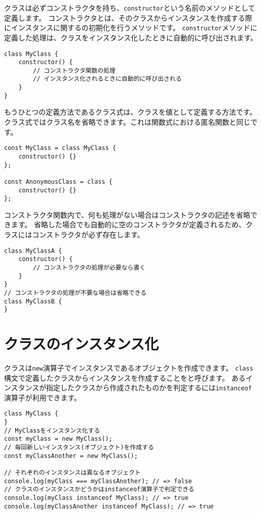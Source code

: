 クラスは必ずコンストラクタを持ち、\texttt{constructor}という名前のメソッドとして定義します。
コンストラクタとは、そのクラスからインスタンスを作成する際にインスタンスに関する\textbf{}の初期化を行うメソッドです。
\texttt{constructor}メソッドに定義した処理は、クラスをインスタンス化したときに自動的に呼び出されます。

\enlargethispage{\baselineskip}\begin{lstlisting}
class MyClass {
    constructor() {
        // コンストラクタ関数の処理
        // インスタンス化されるときに自動的に呼び出される
    }
}
\end{lstlisting}

もうひとつの定義方法であるクラス式は、クラスを値として定義する方法です。
クラス式ではクラス名を省略できます。これは関数式における匿名関数と同じです。

\begin{lstlisting}
const MyClass = class MyClass {
    constructor() {}
};

const AnonymousClass = class {
    constructor() {}
};
\end{lstlisting}

コンストラクタ関数内で、何も処理がない場合はコンストラクタの記述を省略できます。
省略した場合でも自動的に空のコンストラクタが定義されるため、クラスにはコンストラクタが必ず存在します。

\begin{lstlisting}
class MyClassA {
    constructor() {
        // コンストラクタの処理が必要なら書く
    }
}
// コンストラクタの処理が不要な場合は省略できる
class MyClassB {
}
\end{lstlisting}

\hypertarget{class-instance}{%
\section{クラスのインスタンス化}\label{class-instance}}

クラスは\texttt{new}演算子でインスタンスであるオブジェクトを作成できます。
\texttt{class}構文で定義したクラスからインスタンスを作成することを\textbf{}と呼びます。
あるインスタンスが指定したクラスから作成されたものかを判定するには\texttt{instanceof}演算子が利用できます。

\begin{lstlisting}
class MyClass {
}
// MyClassをインスタンス化する
const myClass = new MyClass();
// 毎回新しいインスタンス(オブジェクト)を作成する
const myClassAnother = new MyClass();

// それぞれのインスタンスは異なるオブジェクト
console.log(myClass === myClassAnother); // => false
// クラスのインスタンスかどうかはinstanceof演算子で判定できる
console.log(myClass instanceof MyClass); // => true
console.log(myClassAnother instanceof MyClass); // => true
\end{lstlisting}

